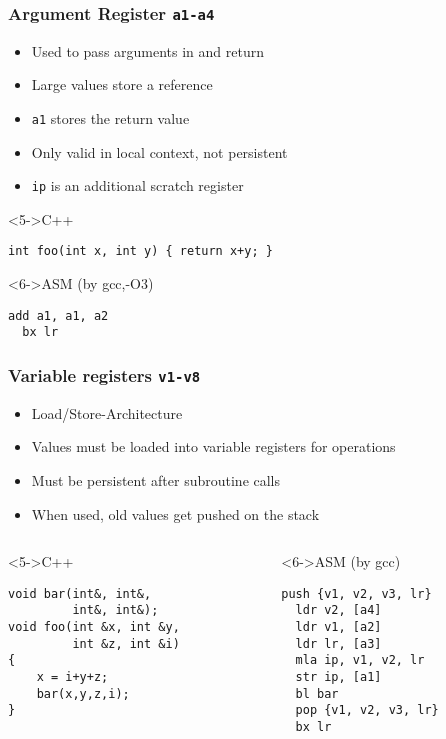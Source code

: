 \documentclass{beamer}
\begin{document}
\begin{frame}[fragile]
\frametitle{Argument Register \lstinline{a1-a4}}
\begin{itemize}
\item<1-> Used to pass arguments in and return
\item<2-> Large values store a reference
\item<3-> \lstinline{a1} stores the return value
\item<4-> Only valid in local context, not persistent
\item<5-> \lstinline{ip} is an additional scratch register
\end{itemize}

\begin{block}<5->{C++}
\begin{lstlisting}
int foo(int x, int y) { return x+y; }
\end{lstlisting}
\end{block}

\begin{block}<6->{ASM (by gcc,-O3)}
\begin{lstlisting}[language=ASM]
  add a1, a1, a2
  bx lr
\end{lstlisting}
\end{block}

\end{frame}

\begin{frame}[fragile]
\frametitle{Variable registers \lstinline{v1-v8}}
\begin{itemize}
\item<1-> Load/Store-Architecture
\item<2-> Values must be loaded into variable registers for operations
\item<3-> Must be persistent after subroutine calls
\item<4-> When used, old values get pushed on the stack
\end{itemize}

\begin{columns}
\begin{column}{0.55\textwidth}
\begin{block}<5->{C++}
\begin{lstlisting}[basicstyle=\small]
void bar(int&, int&, 
         int&, int&);
void foo(int &x, int &y, 
         int &z, int &i)
{ 
    x = i+y+z; 
    bar(x,y,z,i); 
}\end{lstlisting}
\end{block}
\end{column}
\begin{column}{0.45\textwidth}
\begin{block}<6->{ASM (by gcc)}
\begin{lstlisting}[language=ASM,basicstyle=\small]
  push {v1, v2, v3, lr}
  ldr v2, [a4]
  ldr v1, [a2]
  ldr lr, [a3]
  mla ip, v1, v2, lr
  str ip, [a1]
  bl bar
  pop {v1, v2, v3, lr}
  bx lr
\end{lstlisting}
\end{block}
\end{column}
\end{columns}

\end{frame}
\end{document}
